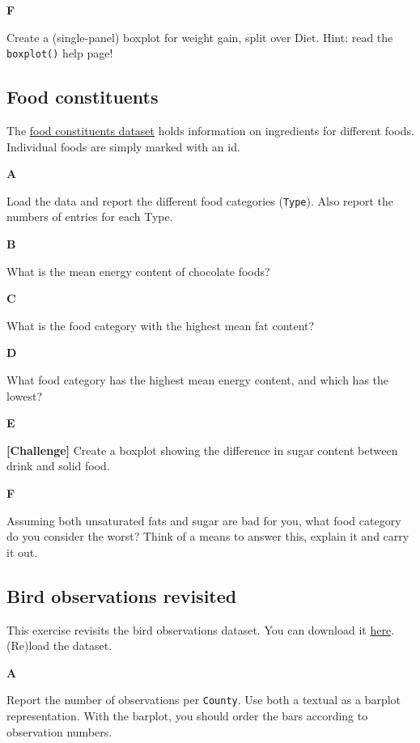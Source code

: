\documentclass[]{book}
\begin{document}
\textbf{F}

Create a (single-panel) boxplot for weight gain, split over Diet. Hint: read the \texttt{boxplot()} help page!

\hypertarget{food-constituents}{%
\subsection{Food constituents}\label{food-constituents}}

The \href{https://raw.githubusercontent.com/MichielNoback/davur1_gitbook/master/data/food_constituents.txt}{food constituents dataset} holds information on ingredients for different foods. Individual foods are simply marked with an id.

\textbf{A}

Load the data and report the different food categories (\texttt{Type}). Also report the numbers of entries for each Type.

\textbf{B}

What is the mean energy content of chocolate foods?

\textbf{C}

What is the food category with the highest mean fat content?

\textbf{D}

What food category has the highest mean energy content, and which has the lowest?

\textbf{E}

\textbf{{[}Challenge{]}} Create a boxplot showing the difference in sugar content between drink and solid food.

\textbf{F}

Assuming both unsaturated fats and sugar are bad for you, what food category do you consider the worst? Think of a means to answer this, explain it and carry it out.

\hypertarget{bird-observations-revisited}{%
\subsection{Bird observations revisited}\label{bird-observations-revisited}}

This exercise revisits the bird observations dataset. You can download it \href{data/Observations-Data-2014.csv}{here}. (Re)load the dataset.

\textbf{A}

Report the number of observations per \texttt{County}. Use both a textual as a barplot representation. With the barplot, you should order the bars according to observation numbers.
\end{document}
